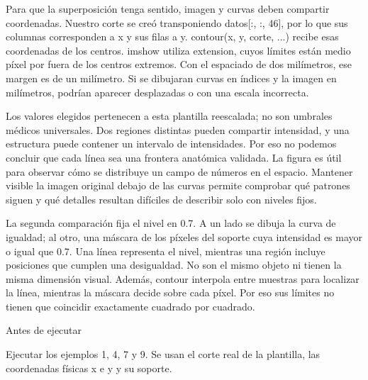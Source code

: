 Para que la superposición tenga sentido, imagen y curvas deben compartir coordenadas. Nuestro corte se creó transponiendo datos[:, :, 46], por lo que sus columnas corresponden a x y sus filas a y. contour(x, y, corte, ...) recibe esas coordenadas de los centros. imshow utiliza extension, cuyos límites están medio píxel por fuera de los centros extremos. Con el espaciado de dos milímetros, ese margen es de un milímetro. Si se dibujaran curvas en índices y la imagen en milímetros, podrían aparecer desplazadas o con una escala incorrecta.


Los valores elegidos pertenecen a esta plantilla reescalada; no son umbrales médicos universales. Dos regiones distintas pueden compartir intensidad, y una estructura puede contener un intervalo de intensidades. Por eso no podemos concluir que cada línea sea una frontera anatómica validada. La figura es útil para observar cómo se distribuye un campo de números en el espacio. Mantener visible la imagen original debajo de las curvas permite comprobar qué patrones siguen y qué detalles resultan difíciles de describir solo con niveles fijos.


La segunda comparación fija el nivel en 0.7. A un lado se dibuja la curva de igualdad; al otro, una máscara de los píxeles del soporte cuya intensidad es mayor o igual que 0.7. Una línea representa el nivel, mientras una región incluye posiciones que cumplen una desigualdad. No son el mismo objeto ni tienen la misma dimensión visual. Además, contour interpola entre muestras para localizar la línea, mientras la máscara decide sobre cada píxel. Por eso sus límites no tienen que coincidir exactamente cuadrado por cuadrado.



\begin{Idea}{Antes de ejecutar}

Ejecutar los ejemplos 1, 4, 7 y 9. Se usan el corte real de la plantilla, las coordenadas físicas x e y y su soporte.


\end{Idea}


